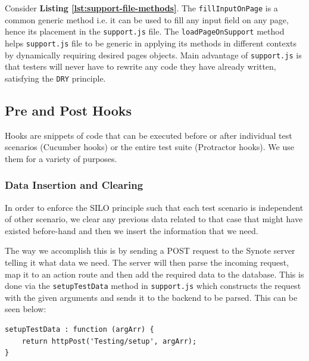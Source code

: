 Consider \textbf{Listing \ref{lst:support-file-methods}}. The \texttt{fillInputOnPage} is a common generic method i.e. it can be used to fill any input field on any page, hence its placement in the \texttt{support.js} file. The \texttt{loadPageOnSupport} method helps \texttt{support.js} file to be generic in applying its methods in different contexts by dynamically requiring desired pages objects. Main advantage of \texttt{support.js} is that testers will never have to rewrite any code they have already written, satisfying the \texttt{DRY} principle.

\subsection{Pre and Post Hooks}
\label{subsec:pre-and-post-hooks}

Hooks are snippets of code that can be executed before or after individual test scenarios (Cucumber hooks) or the entire test suite (Protractor hooks). We use them for a variety of purposes.

\subsubsection{Data Insertion and Clearing}
\label{subsubsec:data-insertion-and-clearing}
In order to enforce the SILO principle such that each test scenario is independent of other scenario, we clear any previous data related to that case that might have existed before-hand and then we insert the information that we need.

The way we accomplish this is by sending a POST request to the Synote server telling it what data we need. The server will then parse the incoming request, map it to an action route and then add the required data to the database. This is done via the \texttt{setupTestData} method in \texttt{support.js} which constructs the request with the given arguments and sends it to the backend to be parsed. This can be seen below:

\begin{listing}[H]
\begin{verbatim}
setupTestData : function (argArr) {
	return httpPost('Testing/setup', argArr);
}
\end{verbatim}
\label{lst:inserting-test-data}
\end{listing}

